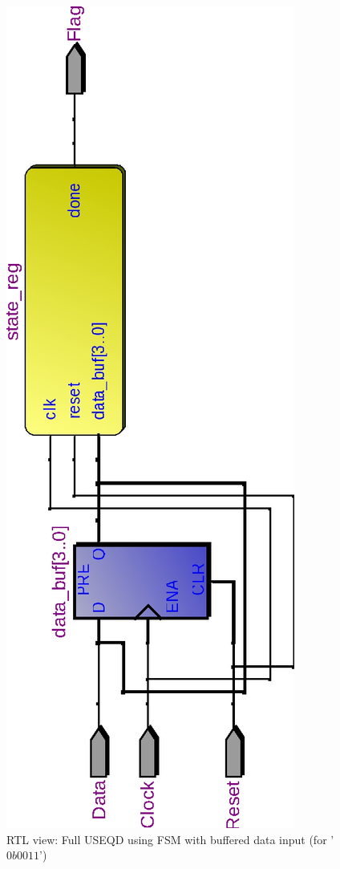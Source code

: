 \documentclass[10pt,a4paper]{report}
\begin{document}
\begin{figure}
\includegraphics[scale=0.8,angle=-90]{graphs/seq_test1.rtl_0011.eps}
\caption{\small{RTL view: Full USEQD using FSM with buffered data input (for '$0b0011$')}} \label{wave:usd:1}
\end{figure}
\end{document}
